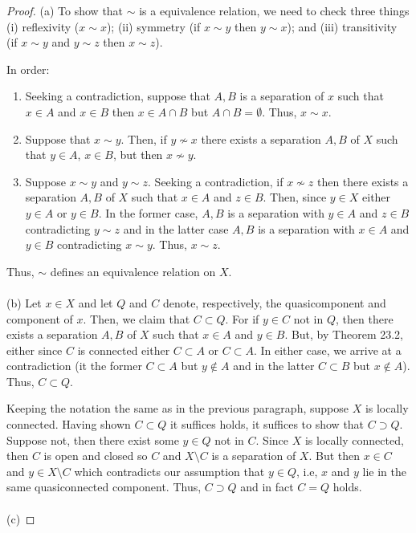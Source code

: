 \begin{proof}
(a) To show that $\sim$ is a equivalence relation, we need to
check three things (i) reflexivity ($x\sim x$); (ii) symmetry (if $x\sim
y$ then $y\sim x$); and (iii) transitivity (if $x\sim y$ and
$y\sim z$ then $x\sim z$).

In order:
\begin{enumerate}[noitemsep,label=(\roman*)]
\item Seeking a contradiction, suppose that $A,B$ is a separation
  of $x$ such that $x\in A$ and $x\in B$ then $x\in A\cap B$ but
  $A\cap B=\emptyset$. Thus, $x\sim x$.
\item Suppose that $x\sim y$. Then, if $y\nsim x$ there exists a
  separation $A,B$ of $X$ such that $y\in A$, $x\in B$, but then
  $x\nsim y$.
\item Suppose $x\sim y$ and $y\sim z$. Seeking a contradiction,
  if $x\nsim z$ then there exists a separation $A,B$ of $X$ such
  that $x\in A$ and $z\in B$. Then, since $y\in X$ either $y\in
  A$ or $y\in B$. In the former case, $A,B$ is a separation with
  $y\in A$ and $z\in B$ contradicting $y\sim z$ and in the latter
  case $A,B$ is a separation with $x\in A$ and $y\in B$
  contradicting $x\sim y$. Thus, $x\sim z$.
\end{enumerate}
Thus, $\sim$ defines an equivalence relation on $X$.
\\\\
(b) Let $x\in X$ and let $Q$ and $C$ denote, respectively, the
quasicomponent and component of $x$. Then, we claim that
$C\subset Q$. For if $y\in C$ not in $Q$, then there exists a
separation $A,B$ of $X$ such that $x\in A$ and $y\in B$. But, by
Theorem 23.2, either since $C$ is connected either $C\subset A$
or $C\subset A$. In either case, we arrive at a contradiction
(it the former $C\subset A$ but $y\notin A$ and in the latter
$C\subset B$ but $x\notin A$). Thus, $C\subset Q$.

Keeping the notation the same as in the previous paragraph,
suppose $X$ is locally connected. Having shown $C\subset Q$ it
suffices holds, it suffices to show that $C\supset Q$. Suppose
not, then there exist some $y\in Q$ not in $C$. Since $X$ is
locally connected, then $C$ is open and closed so $C$ and
$X\setminus C$ is a separation of $X$. But then $x\in C$ and
$y\in X\setminus C$ which contradicts our assumption that $y\in
Q$, i.e, $x$ and $y$ lie in the same quasiconnected
component. Thus, $C\supset Q$ and in fact $C=Q$ holds.
\\\\
(c)
\end{proof}

